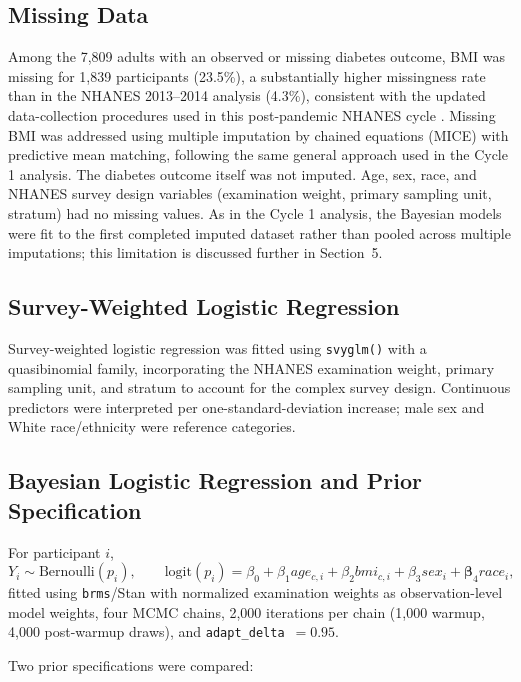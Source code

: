 \documentclass[11pt]{article}
\begin{document}
\subsection{Missing Data}
Among the 7,809 adults with an observed or missing diabetes outcome, BMI was
missing for 1,839 participants (23.5\%), a substantially higher missingness
rate than in the NHANES 2013--2014 analysis (4.3\%), consistent with the
updated data-collection procedures used in this post-pandemic NHANES cycle
\citep{NCHS2023}. Missing BMI was addressed using multiple imputation by
chained equations (MICE) with predictive mean matching, following the same
general approach used in the Cycle 1 analysis. The diabetes outcome itself
was not imputed. Age, sex, race, and NHANES survey design variables
(examination weight, primary sampling unit, stratum) had no missing values.
As in the Cycle 1 analysis, the Bayesian models were fit to the first
completed imputed dataset rather than pooled across multiple imputations;
this limitation is discussed further in Section~5.

\subsection{Survey-Weighted Logistic Regression}
Survey-weighted logistic regression was fitted using \texttt{svyglm()} with
a quasibinomial family, incorporating the NHANES examination weight, primary
sampling unit, and stratum to account for the complex survey design.
Continuous predictors were interpreted per one-standard-deviation increase;
male sex and White race/ethnicity were reference categories.

\subsection{Bayesian Logistic Regression and Prior Specification}
For participant $i$,
\begin{equation}
Y_i \sim \text{Bernoulli}(p_i), \qquad
\text{logit}(p_i) = \beta_0 + \beta_1 age_{c,i} + \beta_2 bmi_{c,i}
+ \beta_3 sex_i + \boldsymbol{\beta}_4 race_i,
\end{equation}
fitted using \texttt{brms}/Stan with normalized examination weights as
observation-level model weights, four MCMC chains, 2,000 iterations per
chain (1,000 warmup, 4,000 post-warmup draws), and
\texttt{adapt\_delta}~$=0.95$.

Two prior specifications were compared:
\end{document}

